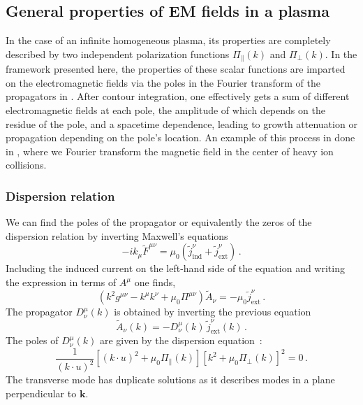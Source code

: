 \subsection{General properties of EM fields in a plasma}
In the case of an infinite homogeneous plasma, its properties are completely described by two independent polarization functions $\Pi_\parallel(k)$ and $\Pi_\perp(k)$. In the framework presented here, the properties of these scalar functions are imparted on the electromagnetic fields via the poles in the Fourier transform of the propagators in . After contour integration, one effectively gets a sum of different electromagnetic fields at each pole, the amplitude of which depends on the residue of the pole, and a spacetime dependence, leading to growth attenuation or propagation depending on the pole's location. An example of this process in done in \cite{Grayson:2022asf}, where we Fourier transform the magnetic field in the center of heavy ion collisions. 

\subsubsection{Dispersion relation}
We can find the poles of the propagator or equivalently the zeros of the dispersion relation by inverting Maxwell's equations
\begin{equation}
    -ik_{\mu}\widetilde{F}^{\mu \nu} = \mu_0( \widetilde{j}_{\mathrm{ind}}^{\nu}+\widetilde{j}_{\mathrm{ext}}^{\nu})\,.
\end{equation}
Including the induced current on the left-hand side of the equation and writing the expression in terms of $A^{\mu}$ one finds,
\begin{equation}
    (k^2g^{\mu \nu} - k^{\mu} k^{\nu} + \mu_0\Pi^{\mu \nu})\widetilde{A}_{\nu} = - \mu_0\widetilde{j}_{\mathrm{ext}}^{\nu} \,.
\end{equation}
The propagator $D^\mu_\nu(k)$ is obtained by inverting the previous equation
\begin{equation}
    \widetilde{A}_{\nu}(k) = -D^{\mu}_{\nu}(k) \,\widetilde{j}_{\mathrm{ext}}^{\nu}(k) \,.
\end{equation}
The poles of $D^\mu_\nu(k)$ are given by the dispersion equation~\cite{melrose2008quantum}:
\begin{equation}\label{eq:disp}
 \frac{1}{(k\cdot u)^2}\left[(k\cdot u)^2+ \mu_0\Pi_\parallel(k)\right]\left[k^2 + \mu_0 \Pi_\perp(k)\right]^2=0 \,.
\end{equation}
The transverse mode has duplicate solutions as it describes modes in a plane perpendicular to $\boldsymbol{k}$.

